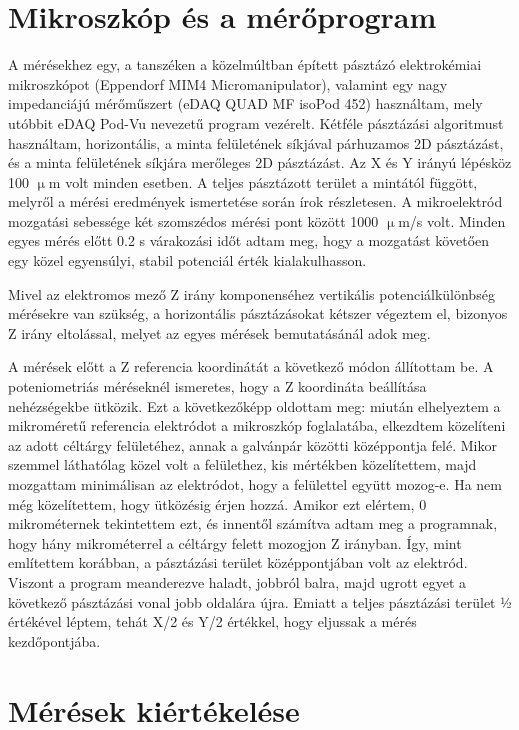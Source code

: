 \section{Mikroszkóp és a mérőprogram}

A mérésekhez egy, a tanszéken a közelmúltban épített pásztázó elektrokémiai mikroszkópot (Eppendorf MIM4 Micromanipulator), valamint egy nagy impedanciájú mérőműszert (eDAQ QUAD MF isoPod 452) használtam, mely utóbbit  eDAQ Pod-Vu nevezetű program vezérelt. Kétféle pásztázási algoritmust használtam, horizontális, a minta felületének síkjával párhuzamos 2D pásztázást, és a minta felületének síkjára merőleges 2D pásztázást. Az X és Y irányú lépésköz 100 $\upmu$m volt minden esetben. A teljes pásztázott terület a mintától függött, melyről a mérési eredmények ismertetése során írok részletesen. A mikroelektród mozgatási sebessége két szomszédos mérési pont között 1000 $\upmu$m/s volt. Minden egyes mérés előtt 0.2 s várakozási időt adtam meg, hogy a mozgatást követően egy közel egyensúlyi, stabil potenciál érték kialakulhasson.  

Mivel az elektromos mező Z irány komponenséhez vertikális potenciálkülönbség mérésekre van szükség, a horizontális pásztázásokat kétszer végeztem el, bizonyos Z irány eltolással, melyet az egyes mérések bemutatásánál adok meg.

A mérések előtt a Z referencia koordinátát a következő módon állítottam be. A poteniometriás méréseknél ismeretes, hogy a Z koordináta beállítása nehézségekbe ütközik. Ezt a következőképp oldottam meg: miután elhelyeztem a mikroméretű referencia elektródot a mikroszkóp foglalatába, elkezdtem közelíteni az adott céltárgy felületéhez, annak a galvánpár közötti középpontja felé. Mikor szemmel láthatólag közel volt a felülethez, kis mértékben közelítettem, majd mozgattam minimálisan az elektródot, hogy a felülettel együtt mozog-e. Ha nem még közelítettem, hogy ütközésig érjen hozzá. Amikor ezt elértem, 0 mikrométernek tekintettem ezt, és innentől számítva adtam meg a programnak, hogy hány mikrométerrel a céltárgy felett mozogjon Z irányban. Így, mint említettem korábban, a pásztázási terület középpontjában volt az elektród. Viszont a program meanderezve haladt, jobbról balra, majd ugrott egyet a következő pásztázási vonal jobb oldalára újra.  Emiatt a teljes pásztázási terület ½ értékével léptem, tehát X/2 és Y/2 értékkel, hogy eljussak a mérés kezdőpontjába. 

\section{Mérések kiértékelése}

